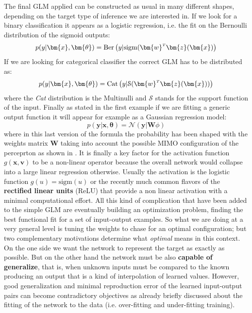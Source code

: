 The final \acl{GLM} applied can be constructed as usual in many different shapes, depending on the target type of inference we are interested in. If we look for a binary classification it appears as a logistic regression, i.e. the fit on the Bernoulli distribution of the sigmoid outputs:
\begin{equation}
    p(y|\bm{x}, \bm{\theta}) = \text{Ber}\left( y|\text{sigm}(\transpose{\bm{w}}\bm{z}(\bm{x}) \right)
\end{equation}
If we are looking for categorical classifier the correct GLM has to be distributed as:
\begin{equation}
    p(y|\bm{x}, \bm{\theta}) = \text{Cat}\left( y|\mathcal{S}(\transpose{\bm{w}}\bm{z}(\bm{x})) \right)
\end{equation}
where the \textit{Cat} distribution is the Multinulli and $\mathcal{S}$ stands for the support function of the input.
Finally as stated in the first example if we are fitting a generic output function it will appear for example as a Gaussian regression model:
\begin{equation}
    p(\bm{y}|\bm{x}, \bm{\theta}) = \mathcal{N}\left( \bm{y}|\bm{W} \phi \right)
\end{equation}
where in this last version of the formula the probability has been shaped with the weights matrix $\bm{W}$ taking into account the possible MIMO configuration of the perceprton as shown in \Figure{\ref{fig:mlp_a}}.
It is finally a key factor for the activation function $g(\bm{x},\bm{v})$ to be a non-linear operator because the overall network would collapse into a large linear regression otherwise. Usually the activation is the logistic function $g(u) = \text{sigm}(u)$ or the recently much common flavors of the \textbf{rectified linear units} (ReLU) that provide a non linear activation with a minimal computational effort.
%
% 
All this kind of complication that have been added to the simple GLM are eventually building an optimization problem, finding the best functional fit for a set of input-output examples. So what we are doing at a very general level is tuning the weights to chase for an optimal configuration; but two complementary motivations determine what \textit{optimal} means in this context. On the one side we want the network to represent the target as exactly as possible. But on the other hand the network must be also \textbf{capable of generalize}, that is, when unknown inputs must be compared to the known producing an output that is a kind of interpolation of learned values. However, good generalization and minimal reproduction error of the learned input-output pairs can become contradictory objectives as already briefly discussed about the fitting of the network to the data (i.e. over-fitting and under-fitting training).
